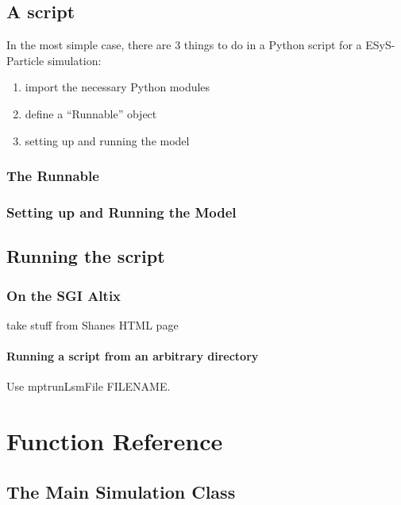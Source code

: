 \documentclass{manual}
\begin{document}
\section{A script}

In the most simple case, there are 3 things to do in a Python script for a ESyS-Particle simulation:
\begin{enumerate}
\item import the necessary Python modules
\item define a ``Runnable'' object  
\item setting up and running the model
\end{enumerate}

\subsection{The Runnable}
\subsection{Setting up and Running the Model}

\section{Running the script}
\subsection{On the SGI Altix}

take stuff from Shanes HTML page

\subsubsection{Running a script from an arbitrary directory}

Use mptrunLsmFile FILENAME.

\chapter{Function Reference}

\section{The Main Simulation Class}
\end{document}
